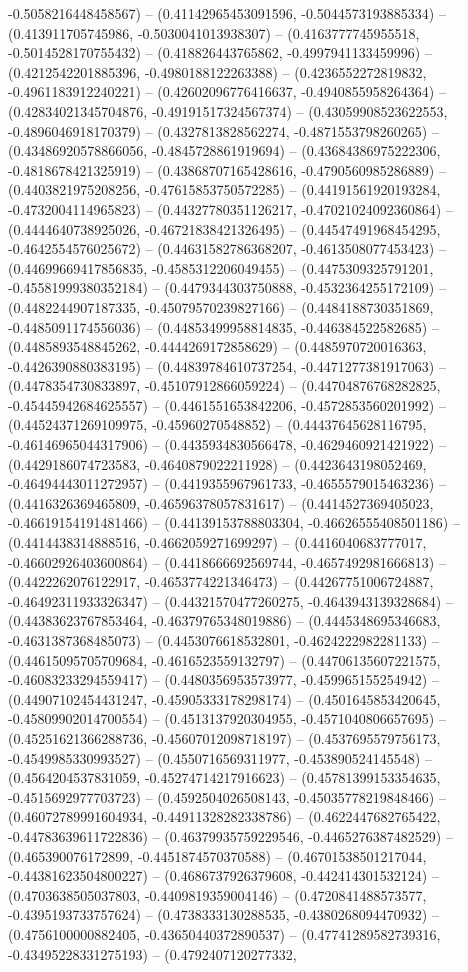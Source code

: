 -0.5058216448458567) -- (0.41142965453091596, -0.5044573193885334) -- (0.413911705745986, -0.5030041013938307) -- (0.4163777745955518, -0.5014528170755432) -- (0.418826443765862, -0.4997941133459996) -- (0.4212542201885396, -0.4980188122263388) -- (0.4236552272819832, -0.4961183912240221) -- (0.42602096776416637, -0.4940855958264364) -- (0.42834021345704876, -0.49191517324567374) -- (0.43059908523622553, -0.4896046918170379) -- (0.4327813828562274, -0.4871553798260265) -- (0.43486920578866056, -0.4845728861919694) -- (0.43684386975222306, -0.4818678421325919) -- (0.43868707165428616, -0.4790560985286889) -- (0.4403821975208256, -0.47615853750572285) -- (0.44191561920193284, -0.4732004114965823) -- (0.44327780351126217, -0.47021024092360864) -- (0.4444640738925026, -0.46721838421326495) -- (0.44547491968454295, -0.4642554576025672) -- (0.44631582786368207, -0.4613508077453423) -- (0.44699669417856835, -0.4585312206049455) -- (0.4475309325791201, -0.45581999380352184) -- (0.4479344303750888, -0.4532364255172109) -- (0.4482244907187335, -0.45079570239827166) -- (0.4484188730351869, -0.4485091174556036) -- (0.44853499958814835, -0.446384522582685) -- (0.4485893548845262, -0.4444269172858629) -- (0.4485970720016363, -0.4426390880383195) -- (0.44839784610737254, -0.4471277381917063) -- (0.4478354730833897, -0.45107912866059224) -- (0.44704876768282825, -0.45445942684625557) -- (0.4461551653842206, -0.4572853560201992) -- (0.44524371269109975, -0.45960270548852) -- (0.44437645628116795, -0.46146965044317906) -- (0.4435934830566478, -0.4629460921421922) -- (0.4429186074723583, -0.4640879022211928) -- (0.4423643198052469, -0.46494443011272957) -- (0.4419355967961733, -0.4655579015463236) -- (0.4416326369465809, -0.46596378057831617) -- (0.4414527369405023, -0.46619154191481466) -- (0.44139153788803304, -0.46626555408501186) -- (0.4414438314888516, -0.4662059271699297) -- (0.4416040683777017, -0.46602926403600864) -- (0.4418666692569744, -0.4657492981666813) -- (0.4422262076122917, -0.4653774221346473) -- (0.44267751006724887, -0.46492311933326347) -- (0.44321570477260275, -0.4643943139328684) -- (0.44383623767853464, -0.46379765348019886) -- (0.4445348695346683, -0.4631387368485073) -- (0.4453076618532801, -0.4624222982281133) -- (0.44615095705709684, -0.4616523559132797) -- (0.44706135607221575, -0.46083233294559417) -- (0.4480356953573977, -0.459965155254942) -- (0.44907102454431247, -0.45905333178298174) -- (0.4501645853420645, -0.45809902014700554) -- (0.4513137920304955, -0.4571040806657695) -- (0.45251621366288736, -0.45607012098718197) -- (0.4537695579756173, -0.4549985330993527) -- (0.4550716569311977, -0.453890524145548) -- (0.4564204537831059, -0.45274714217916623) -- (0.45781399153354635, -0.4515692977703723) -- (0.4592504026508143, -0.45035778219848466) -- (0.46072789991604934, -0.44911328282338786) -- (0.4622447682765422, -0.44783639611722836) -- (0.46379935759229546, -0.4465276387482529) -- (0.465390076172899, -0.4451874570370588) -- (0.46701538501217044, -0.44381623504800227) -- (0.4686737926379608, -0.442414301532124) -- (0.4703638505037803, -0.4409819359004146) -- (0.4720841488573577, -0.4395193733757624) -- (0.4738333130288535, -0.4380268094470932) -- (0.4756100000882405, -0.43650440372890537) -- (0.47741289582739316, -0.43495228331275193) -- (0.4792407120277332, 